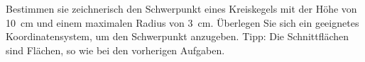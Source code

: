 
\begin{aufgabe}
	Bestimmen sie zeichnerisch den Schwerpunkt eines Kreiskegels mit der Höhe von \SI{10}{cm} und einem maximalen Radius von \SI{3}{cm}.
	Überlegen Sie sich ein geeignetes Koordinatensystem, um den Schwerpunkt anzugeben.
	Tipp: Die Schnittflächen sind Flächen, so wie bei den vorherigen Aufgaben.
\end{aufgabe}
